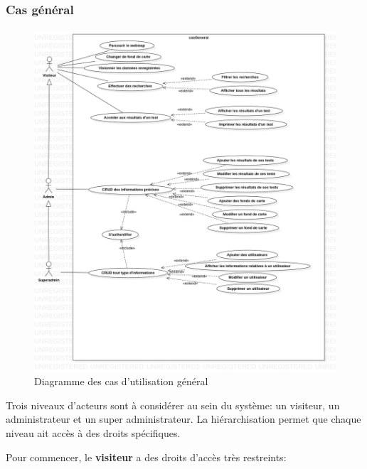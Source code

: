     \subsubsection{Cas général}
    \paragraph{}
    \begin{figure}
        \centering
        \includegraphics[width=1\textwidth]{images/Analyse_des_besoins/casGeneral.png}
        \caption{Diagramme des cas d'utilisation général}
    \end{figure}
    \par 
    Trois niveaux d'acteurs sont à considérer au sein du système: un visiteur, 
    un administrateur et un super administrateur. La hiérarchisation permet que 
    chaque niveau ait accès à des droits spécifiques. \par 
Pour commencer, le \textbf{visiteur} a des droits d'accès très restreints: \par 
